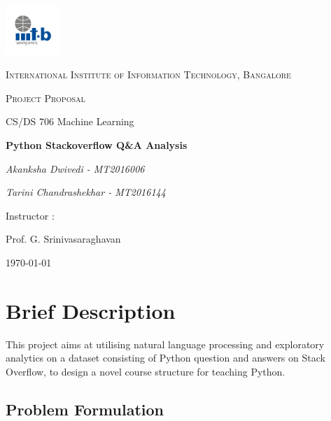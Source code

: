 \documentclass{article}
\begin{document}
\begin{titlepage}
	\centering
	\includegraphics[width=0.15\textwidth]{IIIT-B_logo.jpg}\par\vspace{1cm}
	{\scshape\LARGE International Institute of Information Technology, Bangalore \par}
	\vspace{1cm}
	{\scshape\Large Project Proposal\par}
	{\Large  CS/DS 706 Machine Learning\par}
	\vspace{1.5cm}
	{\huge\bfseries Python Stackoverflow Q\&A Analysis\par}
	\vspace{2cm}
	{\Large\itshape Akanksha Dwivedi - MT2016006\par}
	{\Large\itshape Tarini Chandrashekhar - MT2016144\par}
	\vfill
	Instructor : \par
	Prof. G. Srinivasaraghavan

	\vfill

	{\large \today\par}
\end{titlepage}

\newpage

\tableofcontents

\newpage
\justify

\section{Brief Description}

This project aims at utilising natural language processing and exploratory analytics on a dataset consisting of Python question and answers on Stack Overflow, to design a novel course structure for teaching Python. 

\bigskip
\subsection{Problem Formulation}
\end{document}
